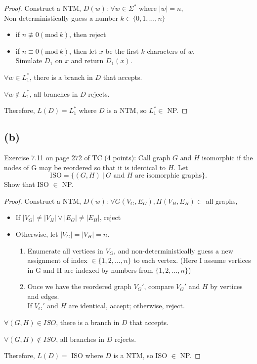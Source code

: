 \documentclass[twoside,11pt]{homework}
\begin{document}
\begin{solution}
\begin{itemize}
\begin{proof}
      Construct a NTM, $D(w)$: $\forall w \in \Sigma^*$ where $|w| = n$,\\
      Non-deterministically guess a number $k \in \{0, 1, \dots, n\}$
      \begin{itemize}
      \item if $n \not\equiv 0 (\text{mod}\ k)$, then reject
      \item if $n \equiv 0 (\text{mod}\ k)$, then let $x$ be the first $k$ characters
        of $w$.\\
        Simulate $D_1$ on $x$ and return $D_1(x)$.
      \end{itemize}

      $\forall w \in L_1^*$, there is a branch in $D$ that accepts.

      $\forall w \notin L_1^*$, all branches in $D$ rejects.

      Therefore, $L(D) = L_1^*$ where $D$ is a NTM, so $L_1^* \in$ NP.
    \end{proof}
  \end{itemize}
\end{solution}

\subsection*{(b)}

\begin{prob}
  Exercise 7.11 on page 272 of TC (4 points):
  Call graph $G$ and $H$ isomorphic if the nodes of G may be reordered so that
  it is identical to $H$.
  Let
  \[
    \text{ISO} = \{ (G, H) \ | \ G \text{ and } H \text{ are isomorphic graphs} \}.
  \]
  Show that ISO $\in$ NP.
\end{prob}
\begin{proof}
  Construct a NTM, $D(w)$:
  $\forall G(V_G, E_G), H(V_H, E_H) \in$ all graphs,
  \begin{itemize}
  \item If $|V_G| \ne |V_H| \lor |E_G| \ne |E_H|$, reject
  \item Otherwise, let $|V_G| = |V_H| = n$.
    \begin{enumerate}
    \item Enumerate all vertices in $V_G$, and non-deterministically guess a
    new assignment of index $\in \{1,2,\dots,n\}$ to each vertex.
    (Here I assume vertices in G and H are indexed by numbers from $\{1,2,\dots,
    n\}$)
    \item Once we have the reordered graph $V_G'$, compare $V_G'$ and $H$ by
      vertices and edges.\\
      If $V_G'$ and $H$ are identical, accept; otherwise, reject.
    \end{enumerate}
  \end{itemize}

  $\forall (G,H) \in ISO$, there is a branch in $D$ that accepts.

  $\forall (G,H) \notin ISO$, all branches in $D$ rejects.

  Therefore, $L(D) = $ ISO where $D$ is a NTM, so ISO $\in$ NP.
\end{proof}
\end{document}
